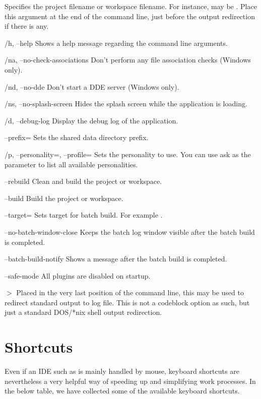 \begin{optentry}
\item[\var{filename}] Specifies the project  filename or workspace  filename. For instance,  may be . Place this argument at the end of the command line, just before the output redirection if there is any.
\item[/h, --help] Shows a help message regarding the command line arguments.
\item[/na, --no-check-associations] Don't perform any file association checks (Windows only).
\item[/nd, --no-dde] Don't start a DDE server (Windows only).
\item[/ns, --no-splash-screen] Hides the splash screen while the application is loading.
\item[/d, --debug-log] Display the debug log of the application.
\item[--prefix=\var{str}] Sets the shared data directory prefix.
\item[/p, --personality=\var{str}, --profile=\var{str}] Sets the personality to use. You can use ask as the parameter to list all available personalities.
\item[--rebuild] Clean and build the project or workspace.
\item[--build] Build the project or workspace.
\item[--target=\var{str}] Sets target for batch build. For example .
\item[--no-batch-window-close] Keeps the batch log window visible after the batch build is completed.
\item[--batch-build-notify] Shows a message after the batch build is completed.
\item[--safe-mode] All plugins are disabled on startup.
\item[$>$ \var{build log file}] Placed in the very last position of the command line, this may be used to redirect standard output to log file. This is not a codeblock option as such, but just a standard DOS/*nix shell output redirection.
\end{optentry}

\section{Shortcuts}

Even if an IDE such as \codeblocks is mainly handled by mouse, keyboard shortcuts are nevertheless a very helpful way of speeding up and simplifying work processes. In the below table, we have collected some of the available keyboard shortcuts.

